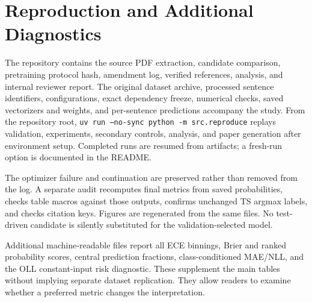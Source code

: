 \documentclass[10pt,twocolumn]{article}
\begin{document}
\appendix
\section{Reproduction and Additional Diagnostics}
The repository contains the source PDF extraction, candidate comparison, pretraining protocol hash, amendment log, verified references, analysis, and internal reviewer report. The original dataset archive, processed sentence identifiers, configurations, exact dependency freeze, numerical checks, saved vectorizers and weights, and per-sentence predictions accompany the study. From the repository root, \texttt{uv run --no-sync python -m src.reproduce} replays validation, experiments, secondary controls, analysis, and paper generation after environment setup. Completed runs are resumed from artifacts; a fresh-run option is documented in the README.

The optimizer failure and continuation are preserved rather than removed from the log. A separate audit recomputes final metrics from saved probabilities, checks table macros against those outputs, confirms unchanged TS argmax labels, and checks citation keys. Figures are regenerated from the same files. No test-driven candidate is silently substituted for the validation-selected model.

Additional machine-readable files report all ECE binnings, Brier and ranked probability scores, central prediction fractions, class-conditioned MAE/NLL, and the OLL constant-input risk diagnostic. These supplement the main tables without implying separate dataset replication. They allow readers to examine whether a preferred metric changes the interpretation.



\end{document}
